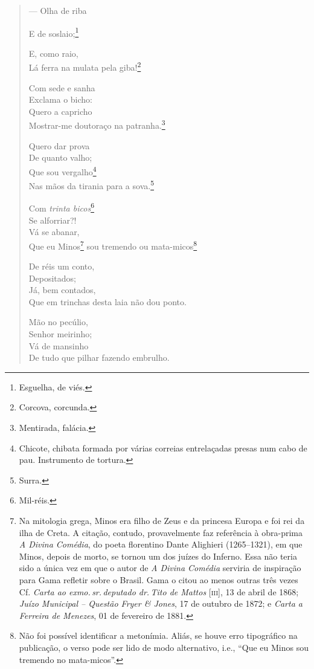 \begin{verse}
--- Olha de riba

E de soslaio;\footnote{ Esguelha, de viés.}

E, como raio,\\
Lá ferra na mulata pela giba!\footnote{ Corcova, corcunda.}

Com sede e sanha\\
Exclama o bicho:\\
Quero a capricho\\
Mostrar-me doutoraço na patranha.\footnote{ Mentirada, falácia.}

Quero dar prova\\
De quanto valho;\\
Que sou vergalho\footnote{Chicote, chibata formada por várias correias
  entrelaçadas presas num cabo de pau. Instrumento de tortura.}\\
Nas mãos da tirania para a sova.\footnote{ Surra.}

Com \emph{trinta bicos}\footnote{ Mil-réis.}\\
Se alforriar?!\\
Vá se abanar,\\
Que eu Minos\footnote{ Na mitologia grega, Minos era filho de Zeus e da
  princesa Europa e foi rei da ilha de Creta. A citação, contudo,
  provavelmente faz referência à obra-prima \emph{A Divina Comédia}, do
  poeta florentino Dante Alighieri (1265--1321), em que Minos, depois de
  morto, se tornou um dos juízes do Inferno. Essa não teria sido a única
  vez em que o autor de \emph{A Divina Comédia} serviria de inspiração
  para Gama refletir sobre o Brasil. Gama o citou ao menos outras três
  vezes Cf. \emph{Carta ao exmo.\,sr.\,deputado dr.\,Tito de Mattos}
  {[}\textsc{iii}{]}, 13 de abril de 1868; \emph{Juízo Municipal -- Questão Fryer \&
  Jones}, 17 de outubro de 1872; e \emph{Carta a Ferreira de Menezes}, 01 de fevereiro de 1881.}
sou tremendo ou mata-micos\footnote{ Não foi possível identificar a
  metonímia. Aliás, se houve erro tipográfico na publicação, o verso
  pode ser lido de modo alternativo, i.e., ``Que eu Minos sou tremendo no
  mata-micos''.}

De réis um conto,\\
Depositados;\\
Já, bem contados,\\
Que em trinchas desta laia não dou ponto.

Mão no pecúlio,\\
Senhor meirinho;\\
Vá de mansinho\\
De tudo que pilhar fazendo embrulho.


\end{verse}
